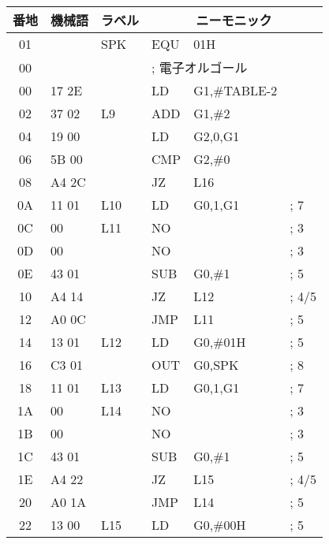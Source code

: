 \begin{figure}[btp]
{\footnotesize\tt\begin{center}
\begin{tabular}{|c|l|l|l l l|} \hline
番地 & 機械語 & ラベル & \multicolumn{3}{|c|}{ニーモニック} \\
\hline
01 &              &  SPK    & EQU    & 01H         &   \\
00 &              &         & \multicolumn{3}{|l|}{; 電子オルゴール}\\
00 & 17 2E        &         & LD     & G1,\#TABLE-2&   \\
02 & 37 02        &  L9     & ADD    & G1,\#2      &   \\
04 & 19 00        &         & LD     & G2,0,G1     &   \\
06 & 5B 00        &         & CMP    & G2,\#0      &   \\
08 & A4 2C        &         & JZ     & L16         &   \\
0A & 11 01        &  L10    & LD     & G0,1,G1     &   ; 7\\
0C & 00           &  L11    & NO     &             &   ; 3\\
0D & 00           &         & NO     &             &   ; 3\\
0E & 43 01        &         & SUB    & G0,\#1      &   ; 5\\
10 & A4 14        &         & JZ     & L12         &   ; 4/5\\
12 & A0 0C        &         & JMP    & L11         &   ; 5\\
14 & 13 01        &  L12    & LD     & G0,\#01H    &   ; 5\\
16 & C3 01        &         & OUT    & G0,SPK      &   ; 8\\
18 & 11 01        &  L13    & LD     & G0,1,G1     &   ; 7\\
1A & 00           &  L14    & NO     &             &   ; 3\\
1B & 00           &         & NO     &             &   ; 3\\
1C & 43 01        &         & SUB    & G0,\#1      &  ; 5\\
1E & A4 22        &         & JZ     & L15         &   ; 4/5\\
20 & A0 1A        &         & JMP    & L14         &   ; 5\\
22 & 13 00        &  L15    & LD     & G0,\#00H    &   ; 5\\

\end{tabular}
\end{center}}
\end{figure}
